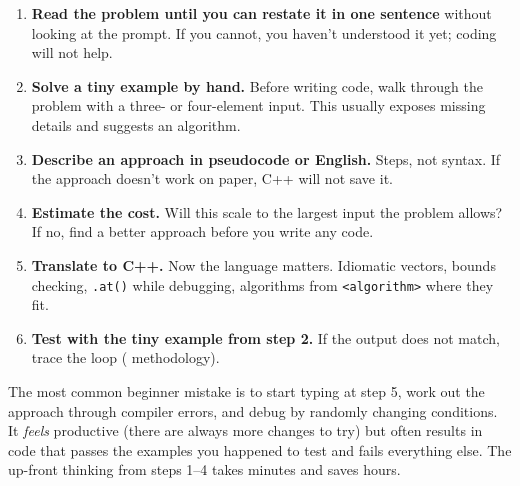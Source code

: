 \documentclass[11pt]{article}
\begin{document}
\begin{enumerate}[leftmargin=*]
    \item \textbf{Read the problem until you can restate it in one
          sentence} without looking at the prompt. If you cannot, you
          haven't understood it yet; coding will not help.
    \item \textbf{Solve a tiny example by hand.} Before writing code,
          walk through the problem with a three- or four-element
          input. This usually exposes missing details and suggests
          an algorithm.
    \item \textbf{Describe an approach in pseudocode or English.}
          Steps, not syntax. If the approach doesn't work on paper,
          C++ will not save it.
    \item \textbf{Estimate the cost.} Will this scale to the largest
          input the problem allows? If no, find a better approach
          before you write any code.
    \item \textbf{Translate to C++.} Now the language matters.
          Idiomatic vectors, bounds checking, \texttt{.at()} while
          debugging, algorithms from \texttt{<algorithm>} where they
          fit.
    \item \textbf{Test with the tiny example from step 2.} If the
          output does not match, trace the loop (
          methodology).
\end{enumerate}

\begin{warnbox}
The most common beginner mistake is to start typing at step 5, work
out the approach through compiler errors, and debug by randomly
changing conditions. It \emph{feels} productive (there are always
more changes to try) but often results in code that passes the
examples you happened to test and fails everything else. The
up-front thinking from steps 1--4 takes minutes and saves hours.
\end{warnbox}
\end{document}
